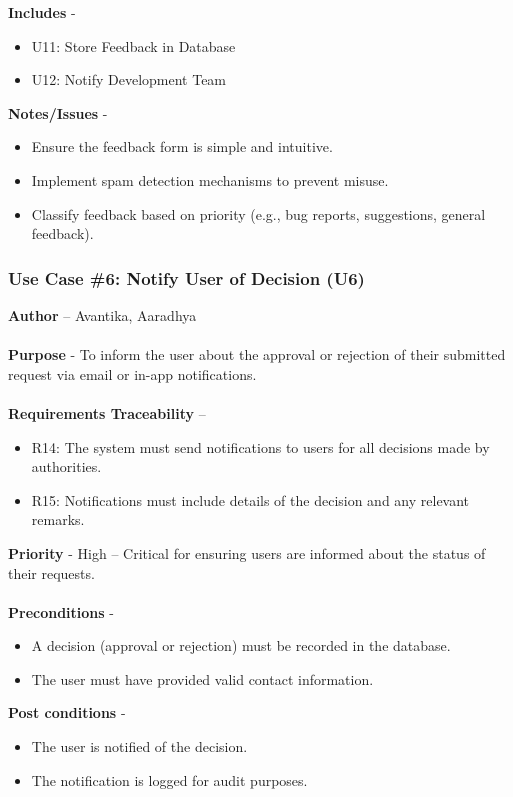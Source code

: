 \documentclass[a4paper,12pt]{article}
\begin{document}
\textbf{Includes} - 
\begin{itemize} 
    \item U11: Store Feedback in Database
    \item U12: Notify Development Team
\end{itemize}
\textbf{Notes/Issues} - 
\begin{itemize} 
    \item Ensure the feedback form is simple and intuitive.
    \item Implement spam detection mechanisms to prevent misuse.
    \item Classify feedback based on priority (e.g., bug reports, suggestions, general feedback).
\end{itemize}
\newpage
 \subsubsection{Use Case \#6: Notify User of Decision (U6)}
\textbf{Author} – Avantika, Aaradhya \\\\
\textbf{Purpose} - To inform the user about the approval or rejection of their submitted request via email or in-app notifications. \\\\
\textbf{Requirements Traceability} – 
\begin{itemize} 
    \item R14: The system must send notifications to users for all decisions made by authorities.
    \item R15: Notifications must include details of the decision and any relevant remarks.
\end{itemize}
\textbf{Priority} - High – Critical for ensuring users are informed about the status of their requests. \\\\
\textbf{Preconditions} - 
\begin{itemize} 
    \item A decision (approval or rejection) must be recorded in the database.
    \item The user must have provided valid contact information.
\end{itemize}
\textbf{Post conditions} - 
\begin{itemize} 
    \item The user is notified of the decision.
    \item The notification is logged for audit purposes.
\end{itemize}
\end{document}
